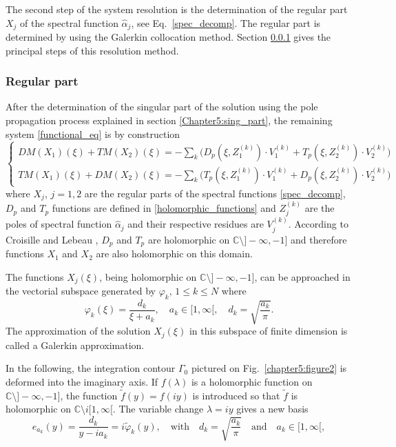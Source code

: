 The second step of the system resolution is the determination of the regular part $X_j$ of the spectral function $\hat{\alpha}_j$, see Eq.~\eqref{spec_decomp}. The regular part is determined by using the Galerkin collocation method. Section \ref{Chapter5:regular_part} gives the principal steps of this resolution method. 

\subsubsection{Regular part}
\label{Chapter5:regular_part}

After the determination of the singular part of the solution using the pole propagation process explained in section \ref{Chapter5:sing_part}, the remaining system \ref{functional_eq} is by construction
\begin{equation}
\label{sys_regular}
\begin{cases}
DM(X_1)(\xi) + TM(X_2)(\xi) = -\underset{k}{\sum} \Big( D_p(\xi,Z_1^{(k)})\cdot V_1^{(k)}+ T_p(\xi,Z_2^{(k)})\cdot V_2^{(k)}\Big)\\
TM(X_1)(\xi) + DM(X_2)(\xi)  =  -\underset{k}{\sum} \Big( T_p(\xi,Z_1^{(k)})\cdot V_1^{(k)}+ D_p(\xi,Z_2^{(k)})\cdot V_2^{(k)}\Big)
\end{cases}
\end{equation}
where $X_j$, $j=1,2$ are the regular parts of the spectral functions \eqref{spec_decomp}, $D_p$ and $T_p$ functions are defined in \eqref{holomorphic_functions} and $Z_j^{(k)}$ are the poles of spectral function $\hat{\alpha}_j$  and their respective residues are $V_j^{(k)}$. According to Croisille and Lebeau \cite{CroisilleLebeau}, $D_p$ and $T_p$ are holomorphic on $\mathbb{C}\setminus  ]-\infty,-1]$ and therefore functions $X_1$ and $X_2$ are also holomorphic on this domain.

The functions $X_j(\xi)$, being holomorphic on $\mathbb{C}\setminus  ]-\infty,-1]$, can be approached in the vectorial subspace generated by $\varphi_k, \, 1 \leq k \leq N$ where
\begin{equation}
\label{Gal_basis}
\varphi_k(\xi) = \dfrac{d_k}{\xi + a_k}, \quad a_k \in [1,\infty[, \quad d_k=\sqrt{\frac{a_k}{\pi}}.
\end{equation}
The approximation of the solution $X_j(\xi)$ in this subspace of finite dimension is called a Galerkin approximation.

In the following, the integration contour $\Gamma_0$ pictured on Fig.~\ref{chapter5:figure2} is deformed into the imaginary axis. If $f(\lambda)$ is a holomorphic function on $\mathbb{C}\setminus  ]-\infty,-1]$, the function $\tilde f (y)=f(iy)$ is introduced so that $\tilde f$ is holomorphic on $\mathbb{C}\setminus i [1,\infty[ $. The variable change $\lambda = iy$ gives a new basis
\begin{equation}
\label{Galerkin_basis}
e_{a_k}(y) = \dfrac{d_k}{y-i{a_k}}=i\tilde \varphi_k(y), \quad \text{with} \quad d_k=\sqrt{\frac{a_k}{\pi}} \quad \text{and} \quad a_k \in [1,\infty[,
\end{equation}

